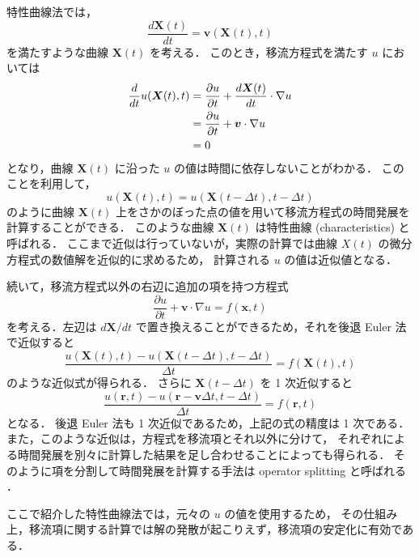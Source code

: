 特性曲線法では，
\begin{equation}
    \frac{d \bm{X}(t)}{dt} = \bm{v}(\bm{X}(t), t)
\end{equation}
を満たすような曲線 $\bm{X}(t)$ を考える．
このとき，移流方程式を満たす $u$ においては
\begin{align}
    \frac{d}{dt} u(\bm{X}(t), t)
     & = \frac{\partial u}{\partial t} + \frac{d \bm{X}(t)}{dt} \cdot \nabla u \notag \\
     & = \frac{\partial u}{\partial t} + \bm{v} \cdot \nabla u \notag                 \\
     & = 0
\end{align}
となり，曲線 $\bm{X}(t)$ に沿った $u$ の値は時間に依存しないことがわかる．
このことを利用して，
\begin{equation}
    u(\bm{X}(t), t) = u(\bm{X}(t - \Delta t), t - \Delta t)
\end{equation}
のように曲線 $\bm{X}(t)$ 上をさかのぼった点の値を用いて移流方程式の時間発展を計算することができる．
このような曲線 $\bm{X}(t)$ は特性曲線 (characteristics) と呼ばれる．
ここまで近似は行っていないが，実際の計算では曲線 $X(t)$ の微分方程式の数値解を近似的に求めるため，
計算される $u$ の値は近似値となる．

続いて，移流方程式以外の右辺に追加の項を持つ方程式
\begin{equation}
    \frac{\partial u}{\partial t} + \bm{v} \cdot \nabla u = f(\bm{x}, t)
\end{equation}
を考える．左辺は $d\bm{X}/dt$ で置き換えることができるため，それを後退 Euler 法で近似すると
\begin{equation}
    \frac{u(\bm{X}(t), t) - u(\bm{X}(t - \Delta t), t - \Delta t)}{\Delta t} = f(\bm{X}(t), t)
\end{equation}
のような近似式が得られる．
さらに $\bm{X}(t - \Delta t)$ を 1 次近似すると
\begin{equation}
    \frac{u(\bm{r}, t) - u(\bm{r} - \bm{v} \Delta t, t - \Delta t)}{\Delta t} = f(\bm{r}, t)
\end{equation}
となる．
後退 Euler 法も 1 次近似であるため，上記の式の精度は 1 次である．
また，このような近似は，方程式を移流項とそれ以外に分けて，
それぞれによる時間発展を別々に計算した結果を足し合わせることによっても得られる．
そのように項を分割して時間発展を計算する手法は operator splitting と呼ばれる \cite{Press2007}．

ここで紹介した特性曲線法では，元々の $u$ の値を使用するため，
その仕組み上，移流項に関する計算では解の発散が起こりえず，移流項の安定化に有効である．

